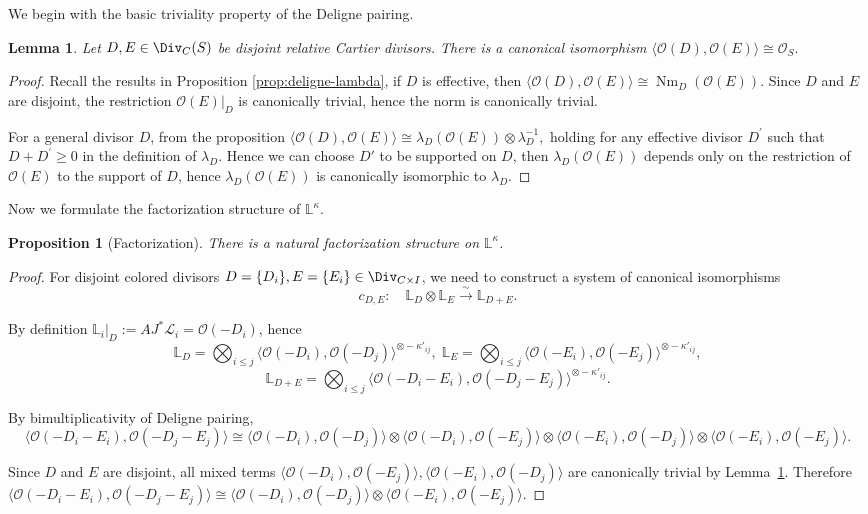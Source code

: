 \documentclass{amsart}
\numberwithin{equation}{section}
\numberwithin{figure}{section}
\newtheorem{lem}[thm]{Lemma}
\newtheorem{prop}[thm]{Proposition}
\theoremstyle{definition}
\theoremstyle{remark}
\renewcommand{\c}[1]{\mathcal{#1}}
\renewcommand{\b}[1]{\mathbb{#1}}
\begin{document}
We begin with the basic triviality property of the Deligne pairing.
\begin{lem}\label{disjoint-trivial}
	Let $D,E\in \Div_C(S)$ be disjoint relative Cartier divisors. There is a canonical isomorphism
	$\langle \mathcal O(D),\mathcal O(E)\rangle \cong \mathcal O_S.$
\end{lem}

\begin{proof}
	Recall the results in Proposition  \ref{prop:deligne-lambda},
	if $D$ is effective, then $\langle \mathcal O(D),\mathcal O(E)\rangle \cong \operatorname{Nm}_D(\mathcal O(E)).$
	Since $D$ and $E$ are disjoint, the restriction $\mathcal O(E)|_D$ is canonically trivial, hence the norm is canonically trivial.
	
	For a general divisor $D$, from the proposition
$	\langle \mathcal O(D),\mathcal O(E)\rangle \cong \lambda_D(\c O(E))\otimes \lambda_D^{-1},$
	holding for any effective divisor $D^\prime$ such that $D+D^\prime\ge 0$ in the definition of $\lambda_{D}$.
	Hence we can choose $D'$ to be supported on $D$, then $\lambda_{D}(\c O(E))$ depends only on the restriction of $\mathcal O(E)$ to the support of $D$, hence $\lambda_{D}(\c O(E))$ is canonically isomorphic to $\lambda_{D}$.
\end{proof}
Now we formulate the factorization structure of $\b L^\kappa$.
\begin{prop}[Factorization]\label{locality}
There is a natural factorization structure on $\b L^\kappa$. 
\end{prop}

\begin{proof}
For disjoint colored divisors $D=\{D_i\},E=\{E_i\}\in \Div_{C\times I}$, we need to construct a system of canonical isomorphisms
\[c_{D,E}:\quad	 \b L_D\otimes \b L_E\xrightarrow{\sim}\b L_{D+E}.\]
		
By definition $\b L_i|_D:=AJ^*\c L_i=\c O(-D_i)$, hence
	\[	\b L_D	=	\bigotimes_{i\le j}	\langle \mathcal O(-D_i),\mathcal O(-D_j)\rangle^{\otimes -\kappa'_{ij}},
	\;	\b L_E	=\bigotimes_{i\le j}
	\langle \mathcal O(-E_i),\mathcal O(-E_j)\rangle^{\otimes -\kappa'_{ij}},\]
	\[\b L_{D+E}
	=
	\bigotimes_{i\le j}
	\langle \mathcal O(-D_i-E_i),\mathcal O(-D_j-E_j)\rangle^{\otimes -\kappa'_{ij}}.
	\]
	
	By bimultiplicativity of Deligne pairing,
	\[		\langle \mathcal O(-D_i-E_i),\mathcal O(-D_j-E_j)\rangle
	\cong
	\langle \mathcal O(-D_i),\mathcal O(-D_j)\rangle
	\otimes
	\langle \mathcal O(-D_i),\mathcal O(-E_j)\rangle 
	\otimes
	\langle \mathcal O(-E_i),\mathcal O(-D_j)\rangle 
	\otimes
	\langle \mathcal O(-E_i),\mathcal O(-E_j)\rangle.
	\]
	
	Since $D$ and $E$ are disjoint, all mixed terms
	$	\langle \mathcal O(-D_i),\mathcal O(-E_j)\rangle,
	\langle \mathcal O(-E_i),\mathcal O(-D_j)\rangle$
	are canonically trivial by Lemma~\ref{disjoint-trivial}. Therefore
$\langle \mathcal O(-D_i-E_i),\mathcal O(-D_j-E_j)\rangle
\cong
\langle \mathcal O(-D_i),\mathcal O(-D_j)\rangle
\otimes
\langle \mathcal O(-E_i),\mathcal O(-E_j)\rangle.$
\end{proof}
\end{document}
